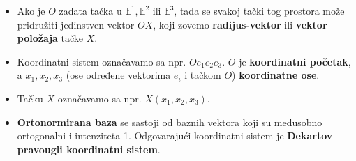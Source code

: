 \documentclass[a4paper,12pt,twoside]{report}
\numberwithin{algorithm}{section}
\begin{document}
\begin{itemize}
    \item Ako je $O$ zadata tačka u $\mathbb{E}^1, \mathbb{E}^2$ ili $\mathbb{E}^3$, tada se svakoj tački tog prostora može pridružiti jedinstven vektor $OX$, koji zovemo \textbf{radijus-vektor} ili \textbf{vektor položaja} tačke $X$.
    \begin{figure}[!h]
        \centering
    \end{figure}
    \item Koordinatni sistem označavamo sa npr. $Oe_1e_2e_3$. $O$ je \textbf{koordinatni početak}, a $x_1, x_2, x_3$ (ose određene vektorima $e_i$ i tačkom $O$) \textbf{koordinatne ose}.
    \item Tačku $X$ označavamo sa npr. $X(x_1, x_2, x_3)$.
    \item \textbf{Ortonormirana baza} se sastoji od baznih vektora koji su međusobno ortogonalni i intenziteta 1. Odgovarajući koordinatni sistem je \textbf{Dekartov pravougli koordinatni sistem}.
\end{itemize}
\end{document}
